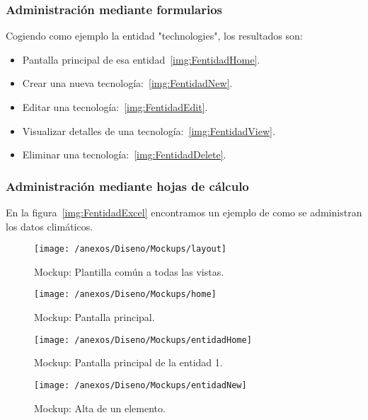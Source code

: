\subsubsection{Administración mediante formularios} 

Cogiendo como ejemplo la entidad "technologies", los resultados son: 

\begin{itemize}
	\item Pantalla principal de esa entidad~\ref{img:FentidadHome}.
	\item Crear una nueva tecnología:~\ref{img:FentidadNew}.
	\item Editar una tecnología:~\ref{img:FentidadEdit}.
	\item Visualizar detalles de una tecnología:~\ref{img:FentidadView}.
	\item Eliminar una tecnología:~\ref{img:FentidadDelete}.
\end{itemize}

\subsubsection{Administración mediante hojas de cálculo} 

En la figura~\ref{img:FentidadExcel} encontramos un ejemplo de como se administran los datos climáticos. 


\begin{figure}[h]
	\centering
	\texttt{[image: /anexos/Diseno/Mockups/layout]}
	\caption{Mockup: Plantilla común a todas las vistas.}
	\label{img:layout}
\end{figure}

\begin{figure}[h]
	\centering
	\texttt{[image: /anexos/Diseno/Mockups/home]}
	\caption{Mockup: Pantalla principal.}
	\label{img:home}
\end{figure}

\begin{figure}[h]
	\centering
	\texttt{[image: /anexos/Diseno/Mockups/entidadHome]}
	\caption{Mockup: Pantalla principal de la entidad 1.}
	\label{img:entidadHome}
\end{figure}

\begin{figure}[h]
	\centering
	\texttt{[image: /anexos/Diseno/Mockups/entidadNew]}
	\caption{Mockup: Alta de un elemento.}
	\label{img:entidadNew}
\end{figure}

